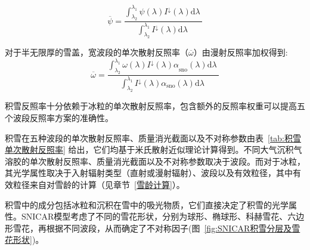 \begin{equation}
  \overline{\psi} = \frac{\int_{\lambda_{2}}^{\lambda_{1}}{\psi(\lambda)I^{\downarrow}(\lambda){\mathrm d}\lambda\ }}{\int_{\lambda_{2}}^{\lambda_{1}}{I^{\downarrow}(\lambda){\mathrm d}\lambda\ }}
\end{equation}

对于半无限厚的雪盖，宽波段的单次散射反照率（\(\overline{\omega}\)）由漫射反照率加权得到:
\begin{equation}
  \overline{\omega} = \frac{\int_{\lambda_{2}}^{\lambda_{1}}{\omega(\lambda){I^{\downarrow}(\lambda)\alpha}_{\mathrm{sno}}(\lambda){\mathrm d}\lambda\ }}{\int_{\lambda_{2}}^{\lambda_{1}}{I^{\downarrow}(\lambda)\alpha_{\mathrm{sno}}(\lambda){\mathrm d}\lambda\ }}
\end{equation}

积雪反照率十分依赖于冰粒的单次散射反照率，包含额外的反照率权重可以提高五个波段反照率方案的准确性\citep{flanner2007PresentdayClimateForcing}。

积雪在五种波段的单次散射反照率、质量消光截面以及不对称参数由表~\ref{tab:积雪单次散射反照率} 给出，它们均基于米氏散射近似理论计算得到。不同大气沉积气溶胶的单次散射反照率、质量消光截面以及不对称参数取决于波段。而对于冰粒，其光学属性取决于入射辐射类型（直射或漫射辐射）、波段以及有效粒径，其中有效粒径来自对雪龄的计算（见章节~\ref{雪龄计算}）。

积雪中的成分包括冰粒和沉积在雪中的吸光物质，它们直接决定了积雪的光学属性。SNICAR模型考虑了不同的雪花形状，分别为球形、椭球形、科赫雪花、六边形雪花\citep{he2017ImpactSnowGrain}，再根据不同波段，从而确定了不对称因子(图~\ref{fig:SNICAR积雪分层及雪花形状})。

